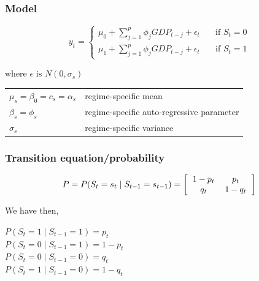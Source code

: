 \documentclass{article}[]
\begin{document}
\subsubsection{Model}




\begin{equation}
y_{t} =   
  \begin{cases}
    \mu_{0} + \sum^p_{j = 1} \phi_j GDP_{t-j} + \epsilon_t      & \quad \text{if } S_t = 0 \\
    \mu_{1} + \sum^p_{j = 1} \phi_j GDP_{t-j} + \epsilon_t      & \quad \text{if } S_t = 1
  \end{cases}
\end{equation}

where $\epsilon \text{ is } N(0,\sigma_s)$


\begin{tabular}{l l}
    $\mu_{s} = \beta_0 = c_s = \alpha_s $    & regime-specific mean    \\
    $\beta_{s} = \phi_s$ & regime-specific  auto-regressive parameter \\
    $\sigma_{s}$ & regime-specific variance    \\

\end{tabular}

\subsubsection{Transition equation/probability}

\begin{equation}
    P = P(S_t = s_t \mid S_{t-1} = s_{t-1}) = 
\left[ \begin{tabular}{c c}
            $1 - p_{t}$	& $p_{t}$ \\ 
            $q_{t}$	& $1 - q_{t}$ \\ 
\end{tabular} \right]
\end{equation}

We have then,

$P(S_t = 1 \mid S_{t-1} = 1) = p_t$   \\ 
$P(S_t = 0 \mid S_{t-1} = 1) = 1 - p_t$ \\
$P(S_t = 0 \mid S_{t-1} = 0) = q_t$   \\
$P(S_t = 1 \mid S_{t-1} = 0) = 1- q_t$ \\
\end{document}

